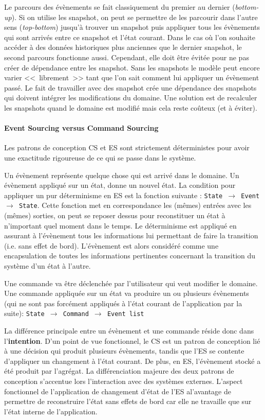 Le parcours des évènements se fait classiquement du premier au dernier 
(\textit{bottom-up}). Si on utilise les \gls{snapshot}, on peut se permettre de les 
parcourir dans l'autre sens (\textit{top-bottom}) jusqu'à trouver un \gls{snapshot} 
puis appliquer tous les évènements qui sont arrivés entre ce \gls{snapshot} et 
l'état courant. Dans le cas où l'on souhaite accéder à des données historiques 
plus anciennes que le dernier \gls{snapshot}, le second parcours fonctionne 
aussi. Cependant, elle doit être évitée pour ne pas créer de dépendance entre 
les \gls{snapshot}. Sans les snapshots le modèle peut encore varier 
<<~librement~>> tant que l'on sait comment lui appliquer un évènement passé. 
Le fait de travailler avec des \gls{snapshot} crée une dépendance des 
snapshots qui doivent intégrer les modifications du domaine. Une solution est 
de recalculer les snapshots quand le domaine est modifié mais cela reste 
coûteux (et à éviter).

\paragraph{Event Sourcing versus Command Sourcing}
Les patrons de conception \gls{CS} et \gls{ES} sont strictement déterministes pour 
avoir une exactitude rigoureuse de ce qui se passe dans le système.

Un évènement représente quelque chose qui est arrivé dans le domaine. Un 
évènement appliqué sur un état, donne un nouvel état. 
La condition pour appliquer un pur déterminisme en \gls{ES} est la fonction 
suivante : \texttt{State $\rightarrow$ Event $\rightarrow$ State}. Cette fonction met 
en correspondance les (mêmes) entrées avec les (mêmes) sorties, on peut se 
reposer dessus pour reconstituer un état à n'important quel moment dans le 
temps. Le déterminisme est appliqué en assurant à l'évènement tous les 
informations lui permettant de faire la transition (i.e. sans effet de bord). 
L'évènement est alors considéré comme une encapsulation de toutes les 
informations pertinentes concernant la transition du système d'un état à l'autre.

Une commande va être déclenchée par l'utilisateur qui veut modifier le domaine. 
Une commande appliquée sur un état va produire un ou plusieurs évènements (qui 
ne sont pas forcément appliqués à l'état courant de l'application par la suite): 
\texttt{State $\rightarrow$ Command $\rightarrow$ Event list}

La différence principale entre un évènement et une commande réside donc dans 
l'\textbf{intention}. D'un point de vue fonctionnel, le \gls{CS} est un patron de 
conception lié à une décision qui produit plusieurs évènements, tandis que 
l'\gls{ES} se contente d'appliquer un changement à l'état courant. De plus, en 
\gls{ES}, l'évènement stocké a été produit par l'agrégat. 
La différenciation majeure des deux patrons de conception s'accentue lors 
l'interaction avec des systèmes externes. L'aspect fonctionnel de l'application de 
changement d'état de l'\gls{ES} al'avantage de permettre de reconstruire l'état sans 
effets de bord car elle ne travaille que sur l'état interne de l'application. 


